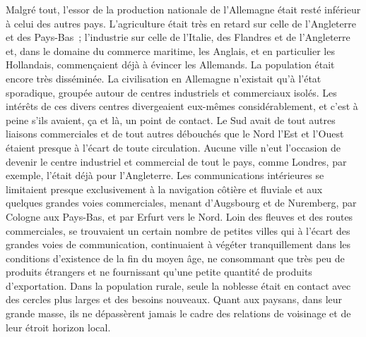 \documentclass[french,twoside]{book} %
\begin{document}
Malgré tout, l’essor de la production nationale de l’Allemagne était resté inférieur à celui des autres pays. L’agriculture était très en retard sur celle de l’Angleterre et des Pays-Bas ; l’industrie sur celle de l’Italie, des Flandres et de l’Angleterre et, dans le domaine du commerce maritime, les Anglais, et en particulier les Hollandais, commençaient déjà à évincer les Allemands. La population était encore très disséminée. La civilisation en Allemagne n’existait qu’à l’état sporadique, groupée autour de centres industriels et commerciaux isolés. Les intérêts de ces divers centres divergeaient eux-mêmes considérablement, et c’est à peine s’ils avaient, ça et là, un point de contact. Le Sud avait de tout autres liaisons commerciales et de tout autres débouchés que le Nord l’Est et l’Ouest étaient presque à l’écart de toute circulation. Aucune ville n’eut l’occasion de devenir le centre industriel et commercial de tout le pays, comme Londres, par exemple, l’était déjà pour l’Angleterre. Les communications intérieures se limitaient presque exclusivement à la navigation côtière et fluviale et aux quelques grandes voies commerciales, menant d’Augsbourg et de Nuremberg, par Cologne aux Pays-Bas, et par Erfurt vers le Nord. Loin des fleuves et des routes commerciales, se trouvaient un certain nombre de petites villes qui à l’écart des grandes voies de communication, continuaient à végéter tranquillement dans les conditions d’existence de la fin du moyen âge, ne consommant que très peu de produits étrangers et ne fournissant qu’une petite quantité de produits d’exportation. Dans la population rurale, seule la noblesse était en contact avec des cercles plus larges et des besoins nouveaux. Quant aux paysans, dans leur grande masse, ils ne dépassèrent jamais le cadre des relations de voisinage et de leur étroit horizon local.\par
\end{document}
